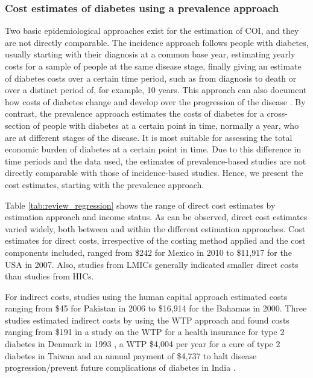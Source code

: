 \subsubsection{Cost estimates of diabetes using a prevalence approach}

Two basic epidemiological approaches exist for the estimation of \ac{COI}, and they  are not directly comparable. The incidence approach follows people with diabetes, usually starting with their diagnosis at a common base year, estimating yearly costs for a sample of people at the same disease stage, finally giving an estimate of diabetes costs over a certain time period, such as from diagnosis to death or over a distinct period of, for example, 10 years. This approach can also document how costs of diabetes change and develop over the progression of the disease \parencite{Larg2011}. By contrast, the prevalence approach estimates the costs of diabetes for a cross-section of people with diabetes at a certain point in time, normally a year, who are at different stages of the disease. It is most suitable for assessing the total economic burden of diabetes at a certain point in time. Due to this difference in time periods and the data used, the estimates of prevalence-based studies are not directly comparable with those of incidence-based studies. Hence, we present the cost estimates, starting with the prevalence approach.

Table \ref{tab:review_regression} shows the range of direct cost estimates by estimation approach and income status.  As can be observed, direct cost estimates varied widely, both between and within the different estimation approaches. Cost estimates for direct costs, irrespective of the costing method applied and the cost components included, ranged from \$242 for Mexico \DIFdelbegin %
\DIFdelend \DIFaddbegin \parencite{Arredondo2005a} \DIFaddend in 2010 to \$11,917 for the USA \parencite{Condliffe2014} in 2007. Also, studies from \acp{LMIC} generally indicated smaller direct costs than studies from \acp{HIC}.

For indirect costs, studies using the human capital approach estimated costs ranging from \$45 for Pakistan \parencite{Khowaja2007a} in 2006 to \$16,914 for the Bahamas \parencite{Barcelo2003} in 2000. Three studies estimated indirect costs by using the \ac{WTP} approach and found costs ranging from \$191 in a study on the \ac{WTP} for a health insurance for type 2 diabetes in Denmark in 1993 \parencite{Gyldmark2001}, a \ac{WTP} \$4,004 per year for a cure of type 2 diabetes \parencite{Chang2010b} in Taiwan  and an annual payment of \$4,737 to halt disease progression/prevent future complications of diabetes in India \parencite{Tharkar2010a}. 

